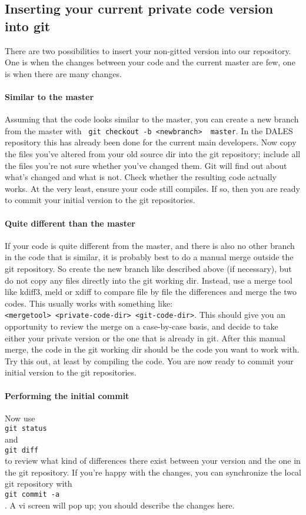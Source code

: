 \documentclass[a4paper,10pt]{article}
\begin{document}
\subsection{Inserting your current private code version into git}
There are two possibilities to insert your non-gitted version into our repository. One is when the changes between your code and the current master are few, one is when there are many changes.

\paragraph*{Similar to the master}
Assuming that the code looks similar to the master, you can create a new branch from the master with \verb| git checkout -b <newbranch>  master|. In the DALES repository this has already been done for the current main developers. Now copy the files you've altered from your old source dir into the git repository; include all the files you're not sure whether you've changed them. Git will find out about what's changed and what is not. Check whether the resulting code actually works. At the very least, ensure your code still compiles. If so, then you are ready to commit your initial version to the git repositories.

\paragraph*{Quite  different than the master}
If your code is quite different from the master, and there is also no other branch in the code that is similar, it is probably best to do a manual merge outside the git repository. So create the new branch like described above (if necessary), but do not copy any files directly into the git working dir. Instead, use a merge tool like kdiff3, meld or xdiff to compare file by file the differences and merge the two codes. This usually works with something like:\\ \verb|<mergetool> <private-code-dir> <git-code-dir>|. This should give you an opportunity to review the merge on a case-by-case basis, and decide to take either your private version or the one that is already in git. After this manual merge, the code in the git working dir should be the code you want to work with. Try this out, at least by compiling the code. You are now ready to commit your initial version to the git repositories.

\paragraph*{Performing the initial commit}
Now use \\ \verb|git status| \\and\\ \verb|git diff| \\ to review what kind of differences there exist between your version and the one in the git repository. If you're happy with the changes, you can synchronize the local git repository with\\ \verb|git commit -a|\\. A vi screen will pop up; you should describe the changes here.
\end{document}
